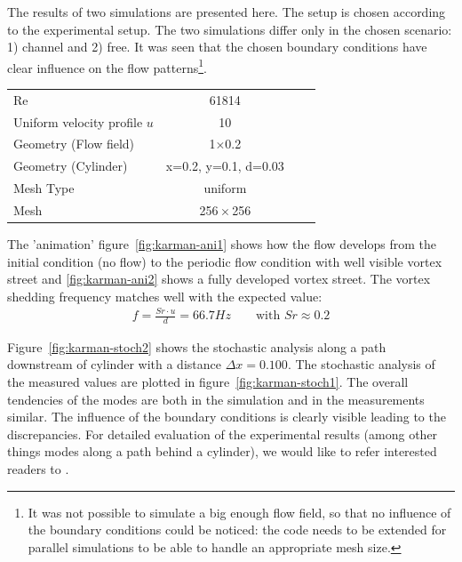 \noii The results of two simulations are presented here. The setup is chosen according to the experimental setup. The two simulations differ only in the chosen scenario: 1) channel and 2) free. It was seen that the chosen boundary conditions have clear influence on the flow patterns\footnote{It was not possible to simulate a big enough flow field, so that no influence of the boundary conditions could be noticed: the code needs to be extended for parallel simulations to be able to handle an appropriate mesh size.}.




\begin{center}
\begin{tabular}{lccc}
\hline 
Re                   & 61814\\      
Uniform velocity profile $u$         & 10 \\
Geometry (Flow field)  &  1$\times$0.2\\
Geometry (Cylinder)  &  x=0.2, y=0.1, d=0.03\\
Mesh Type & uniform \\
Mesh      & 256\,$\times$\,256 \\\hline 
\end{tabular}
\end{center}

\noii The 'animation' figure~\ref{fig:karman-ani1} shows how the flow develops from the initial condition (no flow) to the periodic flow condition with well visible vortex street  and \ref{fig:karman-ani2} shows a fully developed vortex street. The vortex shedding frequency matches well with the expected value:
\begin{align*}
f=\frac{Sr \cdot u}{d}=66.7Hz \qquad \text{with } Sr\approx0.2
\end{align*}

\noii Figure~\ref{fig:karman-stoch2} shows the stochastic analysis along a path downstream of cylinder with a distance $\Delta x = 0.100$. The stochastic analysis of the measured values are plotted in figure~\ref{fig:karman-stoch1}. The overall tendencies of the modes are both in the simulation and in the measurements similar. The influence of the boundary conditions is clearly visible leading to the discrepancies. For detailed evaluation of the experimental results (among other things modes along a path behind a cylinder), we would like to refer interested readers to \citep{koehler2015}. 

\newcommand{\inkarman}[1]{\texttt{[image: \#1]}}


